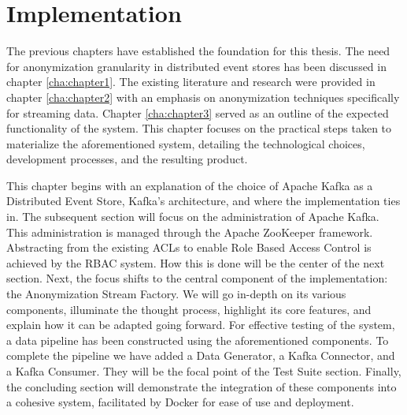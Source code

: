 \chapter{Implementation\label{cha:chapter4}}
The previous chapters have established the foundation for this thesis. The need for anonymization granularity in distributed event stores has been discussed in chapter \ref{cha:chapter1}. The existing literature and research were provided in chapter \ref{cha:chapter2} with an emphasis on anonymization techniques specifically for streaming data. Chapter \ref{cha:chapter3} served as an outline of the expected functionality of the system. This chapter focuses on the practical steps taken to materialize the aforementioned system, detailing the technological choices, development processes, and the resulting product.\par

This chapter begins with an explanation of the choice of Apache Kafka as a Distributed Event Store, Kafka's architecture, and where the implementation ties in. The subsequent section will focus on the administration of Apache Kafka. This administration is managed through the Apache ZooKeeper framework. Abstracting from the existing \acp{ACL} to enable Role Based Access Control is achieved by the \ac{RBAC} system. How this is done will be the center of the next section. Next, the focus shifts to the central component of the implementation: the Anonymization Stream Factory. We will go in-depth on its various components, illuminate the thought process, highlight its core features, and explain how it can be adapted going forward. For effective testing of the system, a data pipeline has been constructed using the aforementioned components. To complete the pipeline we have added a Data Generator, a Kafka Connector, and a Kafka Consumer. They will be the focal point of the Test Suite section. Finally, the concluding section will demonstrate the integration of these components into a cohesive system, facilitated by Docker for ease of use and deployment.

